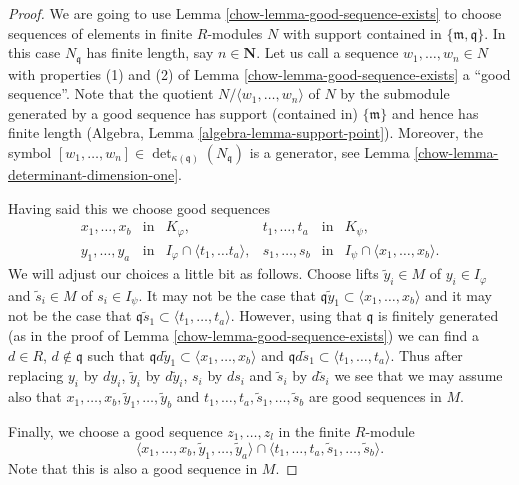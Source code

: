 \begin{proof}
\medskip\noindent
We are going to use Lemma \ref{chow-lemma-good-sequence-exists}
to choose sequences of elements in finite $R$-modules
$N$ with support contained in $\{\mathfrak m, \mathfrak q\}$.
In this case $N_{\mathfrak q}$ has finite length, say $n \in \mathbf{N}$.
Let us call a sequence $w_1, \ldots, w_n \in N$
with properties (1) and (2) of Lemma \ref{chow-lemma-good-sequence-exists}
a ``good sequence''. Note that the quotient
$N/\langle w_1, \ldots, w_n \rangle$ of $N$ by the submodule generated by
a good sequence has support (contained in) $\{\mathfrak m\}$
and hence has finite length (Algebra, Lemma \ref{algebra-lemma-support-point}).
Moreover, the symbol
$[w_1, \ldots, w_n] \in \det_{\kappa(\mathfrak q)}(N_{\mathfrak q})$
is a generator, see Lemma \ref{chow-lemma-determinant-dimension-one}.

\medskip\noindent
Having said this we choose good sequences
$$
\begin{matrix}
x_1, \ldots, x_b & \text{in} & K_\varphi, &
t_1, \ldots, t_a & \text{in} & K_\psi, \\
y_1, \ldots, y_a & \text{in} & I_\varphi \cap \langle t_1, \ldots t_a\rangle, &
s_1, \ldots, s_b & \text{in} & I_\psi \cap \langle x_1, \ldots, x_b\rangle.
\end{matrix}
$$
We will adjust our choices a little bit as follows.
Choose lifts $\tilde y_i \in M$ of $y_i \in I_\varphi$
and $\tilde s_i \in M$ of $s_i \in I_\psi$. It may not be the case
that $\mathfrak q \tilde y_1 \subset \langle x_1, \ldots, x_b\rangle$
and it may not be the case that
$\mathfrak q \tilde s_1 \subset \langle t_1, \ldots, t_a\rangle$.
However, using that $\mathfrak q$ is finitely generated (as in the proof
of Lemma \ref{chow-lemma-good-sequence-exists}) we can find a
$d \in R$, $d \not \in \mathfrak q$ such that
$\mathfrak q d\tilde y_1 \subset \langle x_1, \ldots, x_b\rangle$
and
$\mathfrak q d\tilde s_1 \subset \langle t_1, \ldots, t_a\rangle$.
Thus after replacing $y_i$ by $dy_i$,
$\tilde y_i$ by $d\tilde y_i$, $s_i$ by $ds_i$ and $\tilde s_i$
by $d\tilde s_i$ we see that we may assume also that
$x_1, \ldots, x_b, \tilde y_1, \ldots, \tilde y_b$
and $t_1, \ldots, t_a, \tilde s_1, \ldots, \tilde s_b$
are good sequences in $M$.

\medskip\noindent
Finally, we choose a good sequence
$z_1, \ldots, z_l$ in the finite $R$-module
$$
\langle
x_1, \ldots, x_b, \tilde y_1, \ldots, \tilde y_a
\rangle
\cap
\langle
t_1, \ldots, t_a, \tilde s_1, \ldots, \tilde s_b
\rangle.
$$
Note that this is also a good sequence in $M$.


\end{proof}
